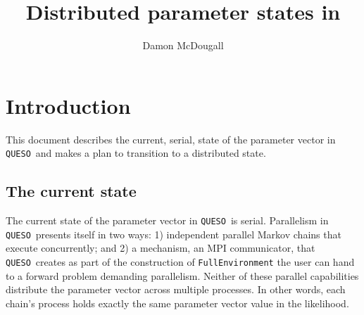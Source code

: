 \documentclass{article}
\title{Distributed parameter states in \Queso}
\author{Damon McDougall}
\newcommand{\Queso}{\texttt{QUESO}}
\begin{document}
\maketitle

\section{Introduction}

This document describes the current, serial, state of the parameter vector in
\Queso\ and makes a plan to transition to a distributed state.

\subsection{The current state}

The current state of the parameter vector in \Queso\ is serial.  Parallelism in
\Queso\ presents itself in two ways: 1) independent parallel Markov chains that
execute concurrently; and 2) a mechanism, an MPI communicator, that \Queso\
creates as part of the construction of \lstinline|FullEnvironment| the user can
hand to a forward problem demanding parallelism.  Neither of these parallel
capabilities distribute the parameter vector across multiple processes.  In
other words, each chain's process holds exactly the same parameter vector
value in the likelihood.
\end{document}
